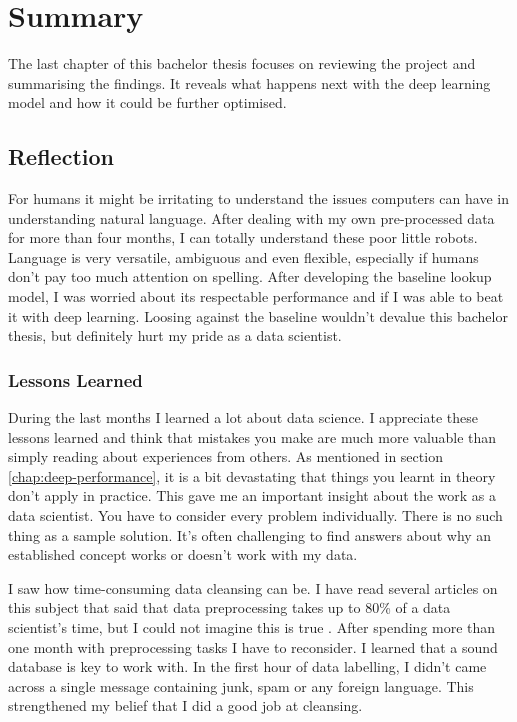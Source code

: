 \chapter{Summary}

The last chapter of this bachelor thesis focuses on reviewing the project and summarising the findings. It reveals what happens next with the deep learning model and how it could be further optimised.

\section{Reflection}

For humans it might be irritating to understand the issues computers can have in understanding natural language. After dealing with my own pre-processed data for more than four months, I can totally understand these poor little robots. Language is very versatile, ambiguous and even flexible, especially if humans don't pay too much attention on spelling.
After developing the baseline lookup model, I was worried about its respectable performance and if I was able to beat it with deep learning. Loosing against the baseline wouldn't devalue this bachelor thesis, but definitely hurt my pride as a data scientist.

\subsection{Lessons Learned}

During the last months I learned a lot about data science. I appreciate these lessons learned and think that mistakes you make are much more valuable than simply reading about experiences from others. As mentioned in section \ref{chap:deep-performance}, it is a bit devastating that things you learnt in theory don't apply in practice. This gave me an important insight about the work as a data scientist. You have to consider every problem individually. There is no such thing as a sample solution. It's often challenging to find answers about why an established concept works or doesn't work with my data.

I saw how time-consuming data cleansing can be. I have read several articles on this subject that said that data preprocessing takes up to 80\% of a data scientist's time, but I could not imagine this is true \cite{naman18}. After spending more than one month with preprocessing tasks I have to reconsider. I learned that a sound database is key to work with. In the first hour of data labelling, I didn't came across a single message containing junk, spam or any foreign language. This strengthened my belief that I did a good job at cleansing.

